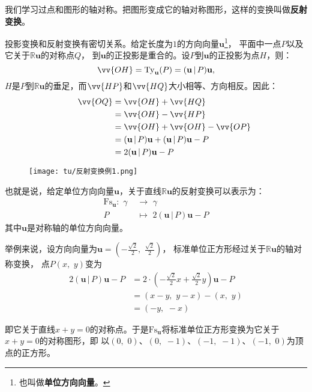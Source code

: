 \documentclass[12pt,UTF8]{ctexbook}
\theoremstyle{definition}
\theoremstyle{plain}
\begin{document}
我们学习过点和图形的轴对称。把图形变成它的轴对称图形，这样的变换叫做\textbf{反射变换}。

投影变换和反射变换有密切关系。给定长度为$1$的方向向量$\mathbf{u}$\footnote{也叫做\textbf{单位方向向量}。}，
平面中一点$P$以及它关于$\mathbb{R}\mathbf{u}$的对称点$Q$，
到$\mathbf{u}$的正投影是重合的。设$P$到$\mathbf{u}$的正投影为点$H$，则：
$$ \vv{OH} = \mathrm{Ty}_\mathbf{u}(P) = (\mathbf{u}\,|\,P)\mathbf{u},  $$
$H$是$P$到$\mathbb{R}\mathbf{u}$的垂足，而$\vv{HP}$和$\vv{HQ}$大小相等、方向相反。因此：
\begin{align*}
    \qquad \vv{OQ} &= \vv{OH} + \vv{HQ}  \\
            &= \vv{OH} - \vv{HP}  \\
            &= \vv{OH} + \vv{OH} - \vv{OP}  \\
            &= (\mathbf{u}\,|\,P)\mathbf{u} + (\mathbf{u}\,|\,P)\mathbf{u} - P  \\
            &= 2(\mathbf{u}\,|\,P)\mathbf{u} - P 
\end{align*}

\begin{wrapfigure}[6]{r}{0.42\textwidth} %
    \vspace{-40pt}
    \flushright
    \texttt{[image: tu/反射变换例1.png]}
\end{wrapfigure}

也就是说，给定单位方向向量$\mathbf{u}$，关于直线$\mathbb{R}\mathbf{u}$的反射变换可以表示为：
\begin{align*}
    \mathrm{Fs}_\mathbf{u} : \,\, \gamma\,\,&\rightarrow \,\, \gamma  \\
    P &\mapsto \,\, 2(\mathbf{u}\,|\,P)\mathbf{u} - P 
\end{align*}
其中$\mathbf{u}$是对称轴的单位方向向量。

\vspace{1.5em}

举例来说，设方向向量为$\mathbf{u} = \left(-\frac{\sqrt{2}}{2},\,\,\frac{\sqrt{2}}{2}\right)$，
标准单位正方形经过关于$\mathbb{R}\mathbf{u}$的轴对称变换，
点$P(x,\,\,y)$变为
\begin{align*}
    2(\mathbf{u}\,|\,P)\mathbf{u} - P &= 2\cdot \left(-\frac{\sqrt{2}}{2}x + \frac{\sqrt{2}}{2}y \right)\mathbf{u} - P  \\
    &= (x - y,\,\, y - x) - (x,\,\, y)  \\
    &= (-y, \,\, -x) 
\end{align*}

即它关于直线$x+y=0$的对称点。于是$\mathrm{Fs}_\mathbf{u}$将标准单位正方形变换为它关于$x+y=0$的对称图形，即
以$(0,\,\,0)$、$(0,\,\,-1)$、$(-1,\,\,-1)$、$(-1,\,\,0)$为顶点的正方形。
\end{document}
